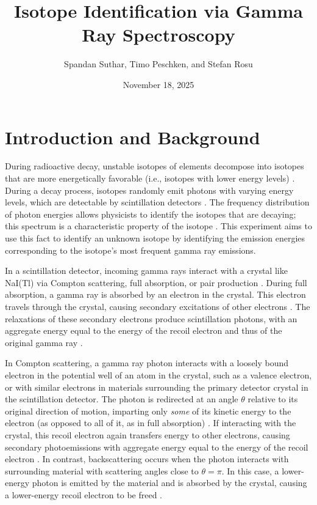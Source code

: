 \documentclass[11pt]{article}
\title{Isotope Identification via Gamma Ray Spectroscopy}
\author{Spandan Suthar, Timo Peschken, and Stefan Rosu}
\date{November 18, 2025}
\begin{document}
\maketitle

\section{Introduction and Background}

During radioactive decay, unstable isotopes of elements decompose into
isotopes that are more energetically favorable (i.e., isotopes with lower
energy levels) \cite{harris}. During a decay process, isotopes randomly emit
photons with varying energy levels, which are detectable by
scintillation detectors \cite{mel, harris}. The frequency distribution of
photon energies allows
physicists to identify the isotopes that are decaying; this spectrum
is a characteristic
property of the isotope \cite{mel, harris}. This experiment aims to
use this fact to
identify an unknown isotope by identifying the emission energies
corresponding to the isotope's most frequent gamma ray emissions.

\vspace{1em}

In a scintillation detector, incoming gamma rays interact with a
crystal like NaI(Tl) via Compton scattering, full absorption, or
pair production \cite{mel, harris}. During full absorption, a gamma ray is
absorbed by
an electron in the crystal. This electron travels through the crystal,
causing secondary excitations of other electrons
\cite{harris,zwiebach}. The relaxations of these
secondary electrons produce scintillation photons, with an aggregate energy
equal to the energy of the recoil electron and thus of the original
gamma ray \cite{mel, mich, zwiebach}.

\vspace{1em}

In Compton scattering,
a gamma ray photon interacts with a loosely bound electron in the
potential well of an atom in the crystal, such as a valence electron, or with
similar electrons in materials surrounding the primary detector crystal
in the scintillation detector.
The photon is redirected at an angle $\theta$ relative to its
original direction of motion,
imparting only \textit{some} of its kinetic energy to the electron
(as opposed to
all of it, as in full absorption) \cite{harris}. If interacting with the
crystal, this recoil electron
again transfers energy to other electrons, causing
secondary photoemissions with aggregate energy equal to the energy of
the recoil electron \cite{ucsb, knoll}. In contrast, backscattering occurs
when the photon
interacts with surrounding material with scattering angles close to
$\theta = \pi$. In this case, a lower-energy photon is emitted by the
material and is absorbed by the crystal, causing a lower-energy recoil electron
to be freed \cite{ucsb}.
\end{document}
